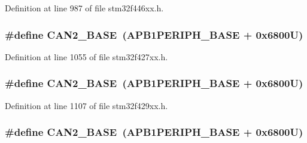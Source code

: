 Definition at line 987 of file stm32f446xx.\+h.

\subsubsection[{\texorpdfstring{C\+A\+N2\+\_\+\+B\+A\+SE}{CAN2_BASE}}]{\setlength{\rightskip}{0pt plus 5cm}\#define C\+A\+N2\+\_\+\+B\+A\+SE~({\bf A\+P\+B1\+P\+E\+R\+I\+P\+H\+\_\+\+B\+A\+SE} + 0x6800\+U)}\hypertarget{group___peripheral__memory__map_gaf7b8267b0d439f8f3e82f86be4b9fba1}{}\label{group___peripheral__memory__map_gaf7b8267b0d439f8f3e82f86be4b9fba1}


Definition at line 1055 of file stm32f427xx.\+h.

\subsubsection[{\texorpdfstring{C\+A\+N2\+\_\+\+B\+A\+SE}{CAN2_BASE}}]{\setlength{\rightskip}{0pt plus 5cm}\#define C\+A\+N2\+\_\+\+B\+A\+SE~({\bf A\+P\+B1\+P\+E\+R\+I\+P\+H\+\_\+\+B\+A\+SE} + 0x6800\+U)}\hypertarget{group___peripheral__memory__map_gaf7b8267b0d439f8f3e82f86be4b9fba1}{}\label{group___peripheral__memory__map_gaf7b8267b0d439f8f3e82f86be4b9fba1}


Definition at line 1107 of file stm32f429xx.\+h.

\subsubsection[{\texorpdfstring{C\+A\+N2\+\_\+\+B\+A\+SE}{CAN2_BASE}}]{\setlength{\rightskip}{0pt plus 5cm}\#define C\+A\+N2\+\_\+\+B\+A\+SE~({\bf A\+P\+B1\+P\+E\+R\+I\+P\+H\+\_\+\+B\+A\+SE} + 0x6800\+U)}\hypertarget{group___peripheral__memory__map_gaf7b8267b0d439f8f3e82f86be4b9fba1}{}\label{group___peripheral__memory__map_gaf7b8267b0d439f8f3e82f86be4b9fba1}


